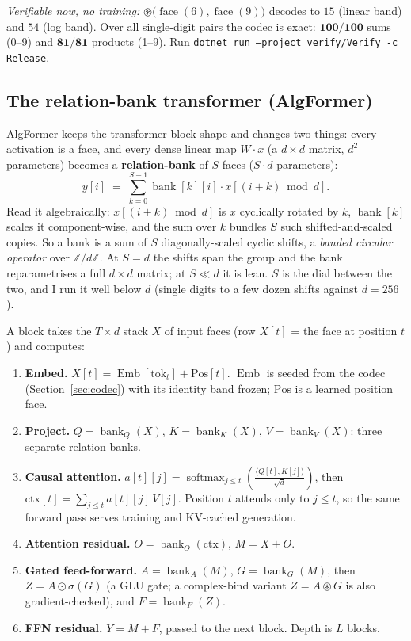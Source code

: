 \documentclass[11pt]{article}
\DeclareMathOperator{\softmax}{softmax}
\newcommand{\bind}{\mathbin{\circledast}}         %
\newcommand{\face}[1]{\operatorname{face}(#1)}
\newcommand{\bank}{\operatorname{bank}}
\newcommand{\Emb}{\operatorname{Emb}}
\newcommand{\code}[1]{\texttt{#1}}
\begin{document}
\emph{Verifiable now, no training:} $\bind\!\big(\face{6}, \face{9}\big)$ decodes to $15$ (linear band)
and $54$ (log band). Over all single-digit pairs the codec is exact: $\mathbf{100/100}$ sums (0--9) and
$\mathbf{81/81}$ products (1--9). Run \code{dotnet run --project verify/Verify -c Release}.

\subsection{The relation-bank transformer (AlgFormer)}\label{sec:algformer}

AlgFormer keeps the transformer block shape \parencite{vaswani2017attention} and changes two things: every
activation is a face, and every dense linear map $W\!\cdot\! x$ (a $d\times d$ matrix, $d^2$ parameters)
becomes a \textbf{relation-bank} of $S$ faces ($S\cdot d$ parameters):
\begin{equation}
y[i] \;=\; \sum_{k=0}^{S-1} \bank[k][i]\cdot x[(i+k)\bmod d].
\label{eq:bank}
\end{equation}
Read it algebraically: $x[(i+k)\bmod d]$ is $x$ cyclically rotated by $k$, $\bank[k]$ scales it
component-wise, and the sum over $k$ bundles $S$ such shifted-and-scaled copies. So a bank is a sum of
$S$ diagonally-scaled cyclic shifts, a \emph{banded circular operator} over $\mathbb{Z}/d\mathbb{Z}$. At
$S=d$ the shifts span the group and the bank reparametrises a full $d\times d$ matrix; at $S\ll d$ it is
lean. $S$ is the dial between the two, and I run it well below $d$ (single digits to a few dozen shifts
against $d = 256$).

A block takes the $T\times d$ stack $X$ of input faces (row $X[t]$ = the face at position $t$) and
computes:
\begin{enumerate}
\item \textbf{Embed.} $X[t] = \Emb[\mathrm{tok}_t] + \mathrm{Pos}[t]$. $\Emb$ is seeded from the codec
(Section~\ref{sec:codec}) with its identity band frozen; $\mathrm{Pos}$ is a learned position face.
\item \textbf{Project.} $Q = \bank_Q(X)$, $K = \bank_K(X)$, $V = \bank_V(X)$: three separate
relation-banks.
\item \textbf{Causal attention.}
$\displaystyle a[t][j] = \softmax_{j\le t}\!\left(\frac{\langle Q[t], K[j]\rangle}{\sqrt{d}}\right)$,
then $\displaystyle \mathrm{ctx}[t] = \sum_{j\le t} a[t][j]\,V[j]$. Position $t$ attends only to
$j\le t$, so the same forward pass serves training and KV-cached generation.
\item \textbf{Attention residual.} $O = \bank_O(\mathrm{ctx})$, $M = X + O$.
\item \textbf{Gated feed-forward.} $A = \bank_A(M)$, $G = \bank_G(M)$, then $Z = A \odot \sigma(G)$ (a
GLU gate; a complex-bind variant $Z = A \bind G$ is also gradient-checked), and $F = \bank_F(Z)$.
\item \textbf{FFN residual.} $Y = M + F$, passed to the next block. Depth is $L$ blocks.
\end{enumerate}
\end{document}

